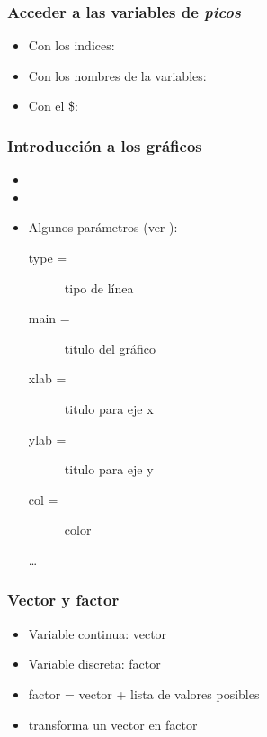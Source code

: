 \documentclass[mathserif]{beamer}
\begin{document}
\begin{frame}[plain,label=d22bis]%
\frametitle{Acceder a las variables de \emph{picos}}
\begin{itemize}
   \item Con los indices: 
   \item Con los nombres de la variables: 
   \item Con el \$: 
\end{itemize}
\end{frame}%

\begin{frame}[plain,label=d23]%
\frametitle{Introducci\'on a los gr\'aficos}
\begin{itemize}
\item {}
\item {}
\item Algunos par\'ametros (ver ): 
   \begin{description}
      \item[type =] tipo de l\'inea
      \item[main =] titulo del gr\'afico
      \item[xlab =] titulo para eje x
      \item[ylab =] titulo para eje y
      \item[col =] color
      \item[\ldots]
   \end{description}
\end{itemize}
\end{frame}%

\begin{frame}[plain,label=d24]%
\frametitle{Vector y factor}
\begin{itemize}
   \item Variable continua: vector
   \item Variable discreta: factor
   \item factor = vector + lista de valores posibles
   \item {} transforma un vector en factor
\end{itemize}
\end{frame}%
\end{document}
